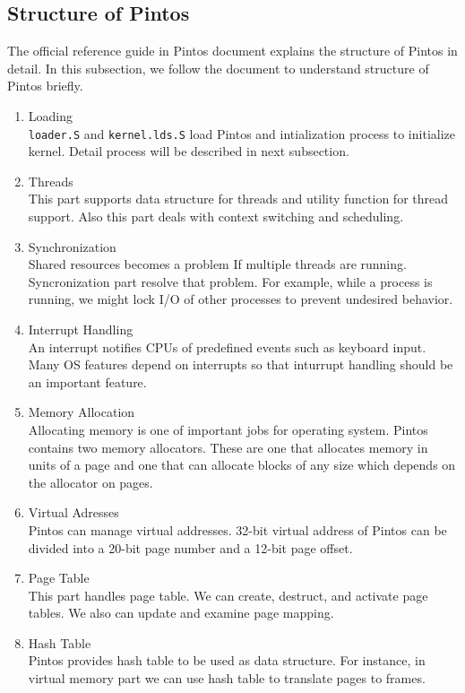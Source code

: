 \documentclass[a4paper,article,11pt,oneside]{article}
\begin{document}
\subsection{Structure of Pintos}\label{subsecstruc}
The official reference guide in Pintos document explains the structure
of Pintos in detail. In this subsection, we follow the document to
understand structure of Pintos briefly.
\begin{enumerate}
\item Loading\\
\texttt{loader.S} and \texttt{kernel.lds.S} load Pintos and
intialization process to initialize kernel. Detail process will be
described in next subsection.
\item Threads\\
This part supports data structure for threads and utility function for
thread support. Also this part deals with context switching and scheduling.
\item Synchronization\\
Shared resources becomes a problem If multiple threads are
running. Syncronization part resolve that problem. For example, while
a process is running, we might lock I/O of other processes to prevent
undesired behavior.
\item Interrupt Handling\\
An interrupt notifies  CPUs of predefined events such as keyboard
input. Many OS features depend on interrupts so that inturrupt
handling should be an important feature.
\item Memory Allocation\\
Allocating memory is one of important jobs for operating
system. Pintos contains two memory allocators. These are one that
allocates memory in units of a page and one that can allocate blocks
of any size which depends on the allocator on pages.
\item Virtual Adresses\\
Pintos can manage virtual addresses. 32-bit virtual address of Pintos
can be divided into a 20-bit page number and a 12-bit page offset.
\item Page Table\\
This part handles page table. We can create, destruct, and activate
page tables. We also can update and examine page mapping.
\item Hash Table\\
Pintos provides hash table to be used as data structure. For instance, in virtual memory part we can use hash table to translate pages to frames.
\end{enumerate}
\end{document}
